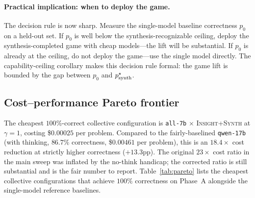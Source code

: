 \documentclass[11pt]{amsart}
\newcommand{\g}{\gamma}
\newcommand\1{{\mathds{1}}}
\theoremstyle{definition}
\theoremstyle{remark}
\numberwithin{equation}{section}
\begin{document}
\paragraph{Practical implication: when to deploy the game.}
The decision rule is now sharp.
Measure the single-model baseline correctness $p_0$ on a held-out set.
If $p_0$ is well below the synthesis-recognizable ceiling, deploy the synthesis-completed game with cheap models---the lift will be substantial.
If $p_0$ is already at the ceiling, do not deploy the game---use the single model directly.
The capability-ceiling corollary makes this decision rule formal: the game lift is bounded by the gap between $p_0$ and $p_{\rm synth}^\star$.

\subsection{Cost--performance Pareto frontier}\label{sec:pareto}

The cheapest $100\%$-correct collective configuration is \texttt{all-7b} $\times$ \textsc{Insight+Synth} at $\g=1$, costing \$$0.00025$ per problem.
Compared to the fairly-baselined \texttt{qwen-17b} (with thinking, $86.7\%$ correctness, \$$0.00461$ per problem), this is an $18.4\times$ cost reduction at strictly higher correctness ($+13.3$pp).
The original $23\times$ cost ratio in the main sweep was inflated by the no-think handicap; the corrected ratio is still substantial and is the fair number to report.
Table~\ref{tab:pareto} lists the cheapest collective configurations that achieve $100\%$ correctness on Phase~A alongside the single-model reference baselines.
\end{document}
